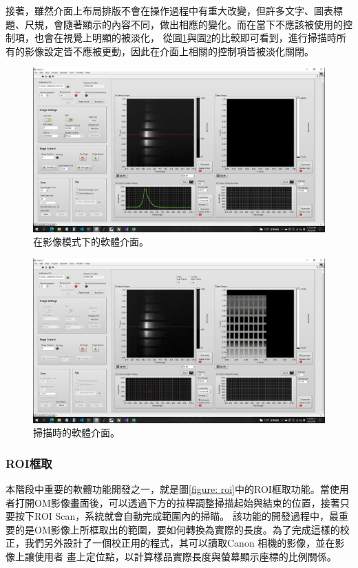 \documentclass[12pt]{article}
\begin{document}
接著，雖然介面上布局排版不會在操作過程中有重大改變，但許多文字、圖表標題、尺規，會隨著顯示的內容不同，做出相應的變化。而在當下不應該被使用的控制項，也會在視覺上明顯的被淡化，
從圖\ref{figure: acquire mode}與圖\ref{figure: scanning}的比較即可看到，進行掃描時所有的影像設定皆不應被更動，因此在介面上相關的控制項皆被淡化關閉。
\begin{figure}
    \centering
    \includegraphics[width=\linewidth]{acquire.jpeg}
    \caption{在影像模式下的軟體介面。}
    \label{figure: acquire mode}
\end{figure}
\begin{figure}
    \centering
    \includegraphics[width=\linewidth]{scanning.jpeg}
    \caption{掃描時的軟體介面。}
    \label{figure: scanning}
\end{figure}
\subsubsection{ROI框取}
本階段中重要的軟體功能開發之一，就是圖\ref{figure: roi}中的ROI框取功能。當使用者打開OM影像畫面後，可以透過下方的拉桿調整掃描起始與結束的位置，接著只要按下ROI Scan，系統就會自動完成範圍內的掃瞄。
該功能的開發過程中，最重要的是OM影像上所框取出的範圍，要如何轉換為實際的長度。為了完成這樣的校正，我們另外設計了一個校正用的程式，其可以讀取Canon 相機的影像，並在影像上讓使用者
畫上定位點，以計算樣品實際長度與螢幕顯示座標的比例關係。
\end{document}

